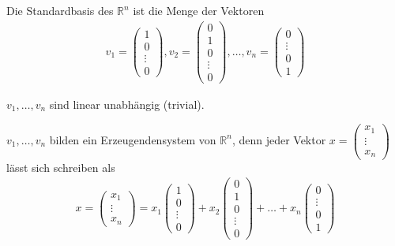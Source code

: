 
Die Standardbasis des $\mathbb{R}^n$ ist die Menge der Vektoren
\begin{align*}
	v_1 = \begin{pmatrix}1\\0\\\vdots\\0\end{pmatrix}, v_2 = \begin{pmatrix}0\\1\\0\\\vdots\\0\end{pmatrix}, \dots, v_n = \begin{pmatrix}0\\\vdots\\0\\1\end{pmatrix}
\end{align*}

$v_1,\dots,v_n$ sind linear unabhängig (trivial).

$v_1,\dots,v_n$ bilden ein Erzeugendensystem von $\mathbb{R}^n$, denn jeder Vektor $x = \begin{pmatrix}x_1\\\vdots\\x_n\end{pmatrix}$ lässt sich schreiben als
\begin{align*}
	x = \begin{pmatrix}x_1\\\vdots\\x_n\end{pmatrix} = x_1\begin{pmatrix}1\\0\\\vdots\\0\end{pmatrix} + x_2\begin{pmatrix}0\\1\\0\\\vdots\\0\end{pmatrix} +\dots+x_n\begin{pmatrix}0\\\vdots\\0\\1\end{pmatrix}
\end{align*}

